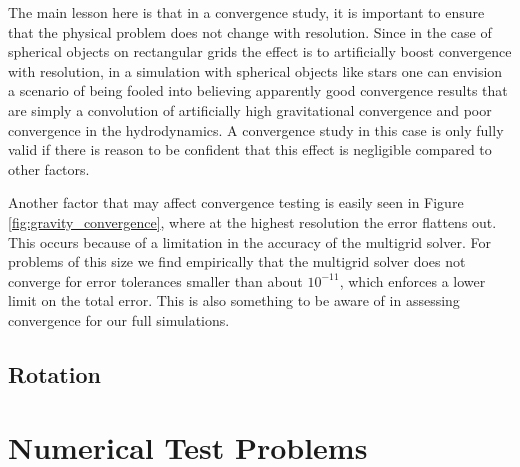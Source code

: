 \documentclass[12pt,preprint]{aastex}
\begin{document}
The main lesson here is that in a convergence study, it is important to ensure that the physical problem does not change with resolution. Since in the case of spherical objects on rectangular grids the effect is to artificially boost convergence with resolution, in a simulation with spherical objects like stars one can envision a scenario of being fooled into believing apparently good convergence results that are simply a convolution of artificially high gravitational convergence and poor convergence in the hydrodynamics. A convergence study in this case is only fully valid if there is reason to be confident that this effect is negligible compared to other factors.

Another factor that may affect convergence testing is easily seen in Figure \ref{fig:gravity_convergence}, where at the highest resolution the error flattens out. This occurs because of a limitation in the accuracy of the multigrid solver. For problems of this size we find empirically that the multigrid solver does not converge for error tolerances smaller than about $10^{-11}$, which enforces a lower limit on the total error. This is also something to be aware of in assessing convergence for our full simulations.

\subsection{Rotation}\label{sec:rotation}

\section{Numerical Test Problems}\label{sec:Tests}
\end{document}
